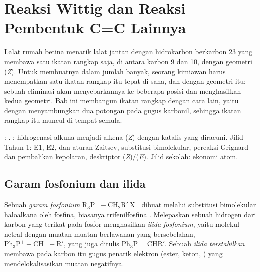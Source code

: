 \chapter{Reaksi Wittig dan Reaksi Pembentuk C=C Lainnya}\label{ch:b2:wittig}

Lalat rumah betina menarik lalat jantan dengan hidrokarbon berkarbon 23 yang
membawa satu ikatan rangkap saja, di antara karbon 9 dan 10, dengan geometri
(\textit{Z}). Untuk membuatnya dalam jumlah banyak, seorang kimiawan harus
menempatkan satu ikatan rangkap itu tepat di sana, dan dengan geometri itu:
sebuah eliminasi akan menyebarkannya ke beberapa posisi dan menghasilkan
kedua geometri. Bab ini membangun ikatan rangkap dengan cara lain, yaitu
dengan menyambungkan dua potongan pada gugus karbonil, sehingga ikatan
rangkap itu muncul di tempat  semula.

\begin{recall}
: . :
hidrogenasi alkuna menjadi alkena (\textit{Z}) dengan katalis yang
diracuni. Jilid Tahun 1: E1, E2, dan aturan Zaitsev, substitusi
bimolekular, pereaksi Grignard dan pembalikan kepolaran, deskriptor
(\textit{Z})/(\textit{E}). Jilid sekolah: ekonomi atom.
\end{recall}

\section{Garam fosfonium dan ilida}

\begin{definition}\label{def:b2:wittig:ylide}
Sebuah \emph{garam fosfonium} $\mathrm{R_3P^+{-}CH_2R'\ X^-}$
dibuat melalui substitusi bimolekular haloalkana oleh fosfina, biasanya
trifenilfosfina . Melepaskan sebuah hidrogen dari karbon yang
terikat pada fosfor menghasilkan \emph{ilida fosfonium},
yaitu molekul netral dengan muatan-muatan berlawanan yang bersebelahan,
$\mathrm{Ph_3P^+{-}CH^-{-}R'}$, yang juga ditulis $\mathrm{Ph_3P{=}CHR'}$.
Sebuah \emph{ilida terstabilkan} membawa pada
karbon itu gugus penarik elektron (ester, keton, ) yang
mendelokalisasikan muatan negatifnya.
\end{definition}


